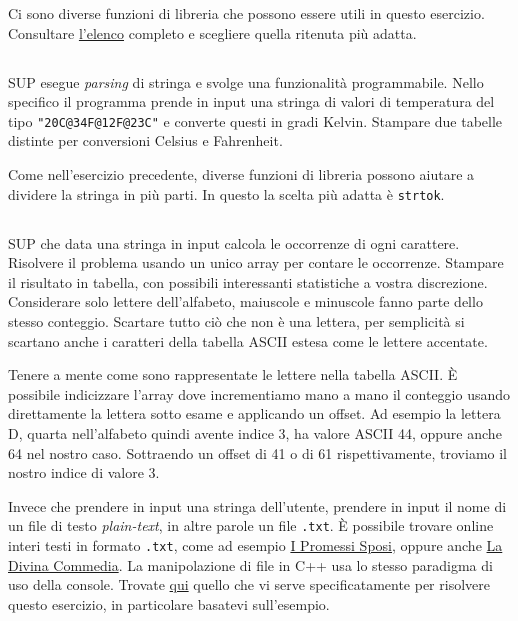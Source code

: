 \documentclass{article}
\begin{document}
\begin{info}
	Ci sono diverse funzioni di libreria che possono essere utili in questo esercizio. Consultare \href{http://www.cplusplus.com/reference/string/string/}{l'elenco} completo e scegliere quella ritenuta più adatta.
\end{info}

\subsection{}
SUP esegue \textit{parsing} di stringa e svolge una funzionalità programmabile. Nello specifico il programma prende in input una stringa di valori di temperatura del tipo \texttt{"20C@34F@12F@23C"} e converte questi in gradi Kelvin. Stampare due tabelle distinte per conversioni Celsius e Fahrenheit.
\begin{info}
	Come nell'esercizio precedente, diverse funzioni di libreria possono aiutare a dividere la stringa in più parti. In questo la scelta più adatta è \texttt{strtok}.
\end{info}

\clearpage

\subsection{}
SUP che data una stringa in input calcola le occorrenze di ogni carattere. Risolvere il problema usando un unico array per contare le occorrenze. Stampare il risultato in tabella, con possibili interessanti statistiche a vostra discrezione. Considerare solo lettere dell'alfabeto, maiuscole e minuscole fanno parte dello stesso conteggio. Scartare tutto ciò che non è una lettera, per semplicità si scartano anche i caratteri della tabella ASCII estesa come le lettere accentate.
\begin{info}
	Tenere a mente come sono rappresentate le lettere nella tabella ASCII. È possibile indicizzare l'array dove incrementiamo mano a mano il conteggio usando direttamente la lettera sotto esame e applicando un offset. Ad esempio la lettera D, quarta nell'alfabeto quindi avente indice 3, ha valore ASCII 44, oppure anche 64 nel nostro caso. Sottraendo un offset di 41 o di 61 rispettivamente, troviamo il nostro indice di valore 3.
\end{info}
\begin{warn} 
	Invece che prendere in input una stringa dell'utente, prendere in input il nome di un file di testo \textit{plain-text}, in altre parole un file \texttt{.txt}. È possibile trovare online interi testi in formato \texttt{.txt}, come ad esempio \href{http://rosada.yolasite.com/resources/i_promessi\%20sposi.txt}{I Promessi Sposi}, oppure anche \href{https://raw.githubusercontent.com/dlang/druntime/master/benchmark/extra-files/dante.txt}{La Divina Commedia}. La manipolazione di file in C++ usa lo stesso paradigma di uso della console. Trovate \href{http://www.cplusplus.com/reference/istream/istream/get/}{qui} quello che vi serve specificatamente per risolvere questo esercizio, in particolare basatevi sull'esempio.
\end{warn}
\end{document}
